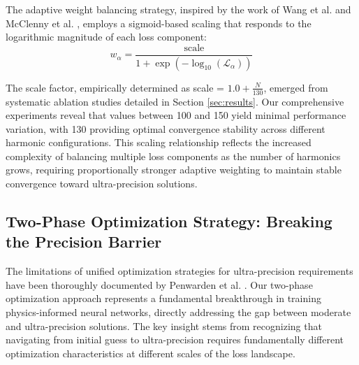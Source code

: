 The adaptive weight balancing strategy, inspired by the work of Wang et al. \cite{wang2021understanding} and McClenny et al. \cite{mcclenny2020self}, employs a sigmoid-based scaling that responds to the logarithmic magnitude of each loss component:
\begin{equation}
w_{\alpha} = \frac{\text{scale}}{1 + \exp(-\log_{10}(\mathcal{L}_{\alpha}))}
\label{eq:adaptive_weights}
\end{equation}

The scale factor, empirically determined as scale = $1.0 + \frac{N}{130}$, emerged from systematic ablation studies detailed in Section \ref{sec:results}. Our comprehensive experiments reveal that values between 100 and 150 yield minimal performance variation, with 130 providing optimal convergence stability across different harmonic configurations. This scaling relationship reflects the increased complexity of balancing multiple loss components as the number of harmonics grows, requiring proportionally stronger adaptive weighting to maintain stable convergence toward ultra-precision solutions.

\subsection{Two-Phase Optimization Strategy: Breaking the Precision Barrier}

The limitations of unified optimization strategies for ultra-precision requirements have been thoroughly documented by Penwarden et al. \cite{penwarden2023unified}. Our two-phase optimization approach represents a fundamental breakthrough in training physics-informed neural networks, directly addressing the gap between moderate and ultra-precision solutions. The key insight stems from recognizing that navigating from initial guess to ultra-precision requires fundamentally different optimization characteristics at different scales of the loss landscape.

